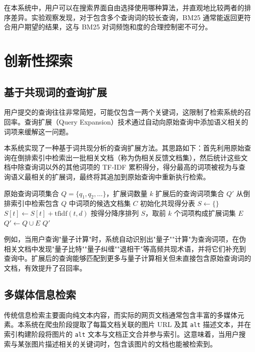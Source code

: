 \documentclass[12pt, a4paper]{ctexart}
\begin{document}
在本系统中，用户可以在搜索界面自由选择使用哪种算法，并直观地比较两者的排序差异。实验观察发现，对于包含多个查询词的较长查询，BM25 通常能返回更符合用户期望的结果，这与 BM25 对词频饱和度的合理控制密不可分。


\section{创新性探索}

\subsection{基于共现词的查询扩展}

用户提交的查询往往非常简短，可能仅包含一两个关键词，这限制了检索系统的召回率。查询扩展（Query Expansion）技术通过自动向原始查询中添加语义相关的词项来缓解这一问题。

本系统实现了一种基于词共现分析的查询扩展方法。其思路如下：首先利用原始查询在倒排索引中检索出一批相关文档（称为伪相关反馈文档集），然后统计这些文档中除查询词以外的其他词项的 TF-IDF 累积得分，得分最高的词项被视为与查询语义最相关的扩展词，最终将其追加到原始查询中重新执行检索。

\begin{algorithm}[H]
\caption{基于共现词分析的查询扩展}
\label{alg:query_expansion}
\begin{algorithmic}[1]
\REQUIRE 原始查询词项集合 $Q = \{q_1, q_2, \ldots\}$，扩展词数量 $k$
\ENSURE 扩展后的查询词项集合 $Q'$
\STATE 从倒排索引中检索包含 $Q$ 中词项的候选文档集 $C$
\STATE 初始化共现得分表 $S \leftarrow \{\}$
        \STATE $S[t] \leftarrow S[t] + \text{tfidf}(t, d)$
    \ENDFOR
\ENDFOR
\STATE 按得分降序排列 $S$，取前 $k$ 个词项构成扩展词集 $E$
\STATE $Q' \leftarrow Q \cup E$
\RETURN $Q'$
\end{algorithmic}
\end{algorithm}

例如，当用户查询"量子计算"时，系统自动识别出"量子""计算"为查询词项，在伪相关文档中发现"量子比特""量子纠缠""退相干"等高频共现术语，并将它们补充到查询中。扩展后的查询能够匹配到更多与量子计算相关但未直接包含原始查询词的文档，有效提升了召回率。

\subsection{多媒体信息检索}

传统信息检索主要面向纯文本内容，而实际的网页文档通常包含丰富的多媒体元素。本系统在爬虫阶段提取了每篇文档关联的图片 URL 及其 \texttt{alt} 描述文本，并在索引构建阶段将图片的 \texttt{alt} 文本与文档正文合并参与索引。这意味着，当用户搜索与某张图片描述相关的关键词时，包含该图片的文档也能被检索到。
\end{document}
